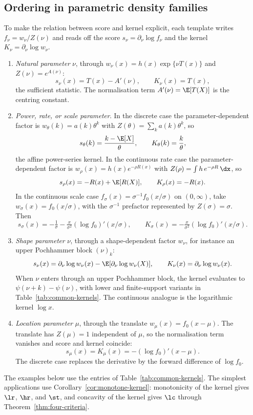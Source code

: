 \documentclass[11pt]{article}
\begin{document}
\subsection{Ordering in parametric density families}
\label{sec:within-applications}
To make the relation between score and kernel explicit, each template writes \(f_\nu=w_\nu/Z(\nu)\) and reads off the score \(s_\nu=\partial_\nu\log f_\nu\) and the kernel \(K_\nu=\partial_\nu\log w_\nu\).
\begin{enumerate}[label=\textup{(\roman*)}]
  \item \emph{Natural parameter} \(\nu\), through \(w_\nu(x)=h(x)\exp\{\nu T(x)\}\) and \(Z(\nu)=e^{A(\nu)}\):
  \[
  s_\nu(x)=T(x)-A'(\nu),\qquad K_\nu(x)=T(x),
  \]
  the sufficient statistic. The normalisation term \(A'(\nu)=\E[T(X)]\) is the centring constant.

  \item \emph{Power, rate, or scale parameter}. In the discrete case the parameter-dependent factor is \(w_\theta(k)=a(k)\theta^k\) with \(Z(\theta)=\sum_k a(k)\theta^k\), so
  \[
  s_\theta(k)=\frac{k-\E[X]}{\theta},\qquad K_\theta(k)=\frac{k}{\theta},
  \]
  the affine power-series kernel. In the continuous rate case the parameter-dependent factor is \(w_\rho(x)=h(x)e^{-\rho R(x)}\) with \(Z(\rho)=\int h\,e^{-\rho R}\,\dx\), so
  \[
  s_\rho(x)=-R(x)+\E[R(X)],\qquad K_\rho(x)=-R(x).
  \]
  In the continuous scale case \(f_\sigma(x)=\sigma^{-1}f_0(x/\sigma)\) on \((0,\infty)\), take \(w_\sigma(x)=f_0(x/\sigma)\), with the \(\sigma^{-1}\) prefactor represented by \(Z(\sigma)=\sigma\). Then
  \[
  s_\sigma(x)=-\tfrac{1}{\sigma}-\tfrac{x}{\sigma^2}(\log f_0)'(x/\sigma),\qquad K_\sigma(x)=-\tfrac{x}{\sigma^2}(\log f_0)'(x/\sigma).
  \]

  \item \emph{Shape parameter} \(\nu\), through a shape-dependent factor \(w_\nu\), for instance an upper Pochhammer block \((\nu)_k\):
  \[
  s_\nu(x)=\partial_\nu\log w_\nu(x)-\E[\partial_\nu\log w_\nu(X)],\qquad K_\nu(x)=\partial_\nu\log w_\nu(x).
  \]
  When \(\nu\) enters through an upper Pochhammer block, the kernel evaluates to \(\psi(\nu+k)-\psi(\nu)\), with lower and finite-support variants in Table~\ref{tab:common-kernels}. The continuous analogue is the logarithmic kernel \(\log x\).

  \item \emph{Location parameter} \(\mu\), through the translate \(w_\mu(x)=f_0(x-\mu)\). The translate has \(Z(\mu)=1\) independent of \(\mu\), so the normalisation term vanishes and score and kernel coincide:
  \[
  s_\mu(x)=K_\mu(x)=-(\log f_0)'(x-\mu).
  \]
  The discrete case replaces the derivative by the forward difference of \(\log f_0\).
\end{enumerate}
The examples below use the entries of Table~\ref{tab:common-kernels}. The simplest applications use Corollary~\ref{cor:monotone-kernel}: monotonicity of the kernel gives $\lr$, $\hr$, and $\st$, and concavity of the kernel gives $\lc$ through Theorem~\ref{thm:four-criteria}.
\end{document}
